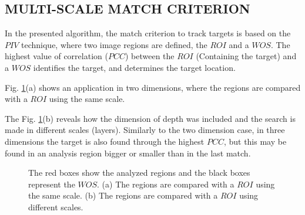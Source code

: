 
\subsection{MULTI-SCALE MATCH CRITERION}
In the presented algorithm, the match criterion to track targets is based on the $PIV$ technique, 
where two image regions are defined, the $ROI$ and a $WOS$. 
The highest value of correlation ($PCC$) between the $ROI$ (Containing the target) and a $WOS$  
identifies the target, and determines the target location.

Fig. \ref{fig:multires}(a) shows an application in two dimensions, where
the regions are compared with a $ROI$ using the same scale.

The Fig. \ref{fig:multires}(b) reveals how the dimension of depth was included and
the search is made in different scales (layers). Similarly to the two dimension case, 
in three dimensions the target is also found through the highest $PCC$, but this may be
found in an analysis region bigger or smaller than in the last match.

\begin{figure}[H]
\centering
  \caption{The red boxes show the analyzed regions and the black boxes represent the $WOS$. 
  (a) The regions are compared with a $ROI$ using the same scale. 
  (b) The regions are compared with a $ROI$ using different scales.}
  \label{fig:multires}
\end{figure}




